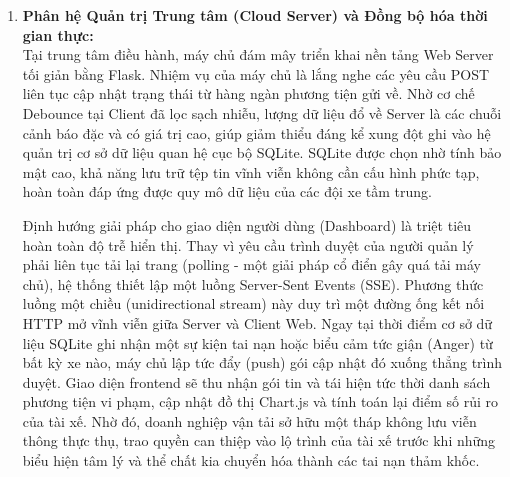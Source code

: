 \documentclass[../DoAn.tex]{subfiles}
\begin{document}
\begin{enumerate}
    Khi thuật toán tại Client phát hiện chỉ số EAR, MAR hoặc cảm xúc vi phạm ngưỡng an toàn đã cấu hình, phần mềm sẽ không lập tức phát tín hiệu đi. Đây là lúc logic cốt lõi tiếp theo tham gia định hướng giải pháp: Bộ lọc Đảo nhiễu (Debounce Logic). Trong thực tế đo lường tín hiệu chuỗi thời gian, các giá trị thường dao động hỗn loạn ở sát vạch ngưỡng. Một cái chớp mắt thông thường hay một cái tặc lưỡi có thể khiến EAR/MAR chạm ngưỡng trong 1-2 khung hình. Nếu không có bộ lọc, hệ thống sẽ kích hoạt vô số cảnh báo giả, gây ra hội chứng "mệt mỏi vì cảnh báo" (alert fatigue) cho tài xế và làm tràn bộ đệm cơ sở dữ liệu. Cơ chế Debounce xử lý vấn đề này bằng cách áp dụng một cửa sổ thời gian chờ (delay window) khoảng từ 800 mili-giây đến 1 giây. Khi phát hiện một lỗi vượt ngưỡng (ví dụ MAR chỉ ra trạng thái "Ngáp"), hệ thống khởi động bộ đếm thời gian. Nếu trạng thái "Ngáp" không được duy trì liên tục và biến mất trước khi hết khoảng thời gian $T_{debounce}$, nó bị phân loại là nhiễu và bị triệt tiêu. Chỉ khi tín hiệu ổn định vượt quá bộ đếm thời gian, sự kiện mới chính thức được ghi nhận. Lúc này, Client sẽ xuất ra tín hiệu âm thanh Beep cảnh báo cục bộ qua hệ thống loa xe, đồng thời đóng gói dữ liệu cấu trúc dạng JSON và thực hiện một lệnh gọi POST lên Server.
    
    \item \textbf{Phân hệ Quản trị Trung tâm (Cloud Server) và Đồng bộ hóa thời gian thực:}\\
    Tại trung tâm điều hành, máy chủ đám mây triển khai nền tảng Web Server tối giản bằng Flask. Nhiệm vụ của máy chủ là lắng nghe các yêu cầu POST liên tục cập nhật trạng thái từ hàng ngàn phương tiện gửi về. Nhờ cơ chế Debounce tại Client đã lọc sạch nhiễu, lượng dữ liệu đổ về Server là các chuỗi cảnh báo đặc và có giá trị cao, giúp giảm thiểu đáng kể xung đột ghi vào hệ quản trị cơ sở dữ liệu quan hệ cục bộ SQLite. SQLite được chọn nhờ tính bảo mật cao, khả năng lưu trữ tệp tin vĩnh viễn không cần cấu hình phức tạp, hoàn toàn đáp ứng được quy mô dữ liệu của các đội xe tầm trung.
    
    Định hướng giải pháp cho giao diện người dùng (Dashboard) là triệt tiêu hoàn toàn độ trễ hiển thị. Thay vì yêu cầu trình duyệt của người quản lý phải liên tục tải lại trang (polling - một giải pháp cổ điển gây quá tải máy chủ), hệ thống thiết lập một luồng Server-Sent Events (SSE). Phương thức luồng một chiều (unidirectional stream) này duy trì một đường ống kết nối HTTP mở vĩnh viễn giữa Server và Client Web. Ngay tại thời điểm cơ sở dữ liệu SQLite ghi nhận một sự kiện tai nạn hoặc biểu cảm tức giận (Anger) từ bất kỳ xe nào, máy chủ lập tức đẩy (push) gói cập nhật đó xuống thẳng trình duyệt. Giao diện frontend sẽ thu nhận gói tin và tái hiện tức thời danh sách phương tiện vi phạm, cập nhật đồ thị Chart.js và tính toán lại điểm số rủi ro của tài xế. Nhờ đó, doanh nghiệp vận tải sở hữu một tháp không lưu viễn thông thực thụ, trao quyền can thiệp vào lộ trình của tài xế trước khi những biểu hiện tâm lý và thể chất kia chuyển hóa thành các tai nạn thảm khốc.
\end{enumerate}
\end{document}
